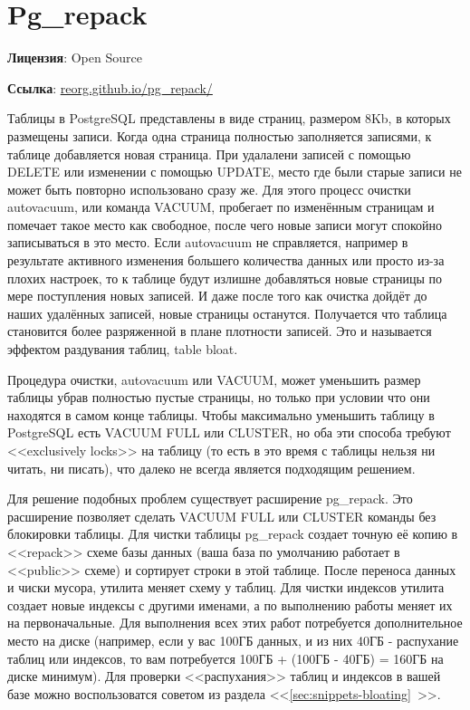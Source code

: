 \section{Pg\_repack}
\textbf{Лицензия}: Open Source

\textbf{Ссылка}: \href{http://reorg.github.io/pg\_repack/}{reorg.github.io/pg\_repack/}

Таблицы в PostgreSQL представлены в виде страниц, размером 8Kb, в которых размещены записи. Когда одна страница полностью заполняется записями, к таблице добавляется новая страница. При удалалени записей с помощью DELETE или изменении с помощью UPDATE, место где были старые записи не может быть повторно использовано сразу же. Для этого процесс очистки autovacuum, или команда VACUUM, пробегает по изменённым страницам и помечает такое место как свободное, после чего новые записи могут спокойно записываться в это место. Если autovacuum не справляется, например в результате активного изменения большего количества данных или просто из-за плохих настроек, то к таблице будут излишне добавляться новые страницы по мере поступления новых записей. И даже после того как очистка дойдёт до наших удалённых записей, новые страницы останутся. Получается что таблица становится более разряженной в плане плотности записей. Это и называется эффектом раздувания таблиц, table bloat.

Процедура очистки, autovacuum или VACUUM, может уменьшить размер таблицы убрав полностью пустые страницы, но только при условии что они находятся в самом конце таблицы. Чтобы максимально уменьшить таблицу в PostgreSQL есть VACUUM FULL или CLUSTER, но оба эти способа требуют <<exclusively locks>> на таблицу (то есть в это время с таблицы нельзя ни читать, ни писать), что далеко не всегда является подходящим решением.

Для решение подобных проблем существует расширение pg\_repack. Это расширение позволяет сделать VACUUM FULL или CLUSTER команды без блокировки таблицы. Для чистки таблицы pg\_repack создает точную её копию в <<repack>> схеме базы данных (ваша база по умолчанию работает в <<public>> схеме) и сортирует строки в этой таблице. После переноса данных и чиски мусора, утилита меняет схему у таблиц. Для чистки индексов утилита создает новые индексы с другими именами, а по выполнению работы меняет их на первоначальные. Для выполнения всех этих работ потребуется дополнительное место на диске (например, если у вас 100ГБ данных, и из них 40ГБ - распухание таблиц или индексов, то вам потребуется 100ГБ + (100ГБ - 40ГБ) = 160ГБ на диске минимум). Для проверки <<распухания>> таблиц и индексов в вашей базе можно воспользоватся советом из раздела <<\ref{sec:snippets-bloating}~>>.


